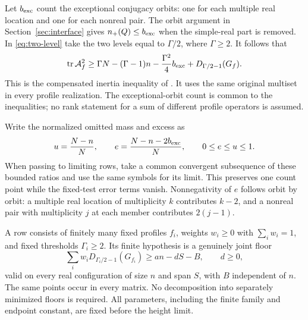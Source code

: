 \documentclass[11pt,reqno]{amsart}
\numberwithin{equation}{section}
\newcommand{\tr}{\operatorname{tr}}
\begin{document}
Let $b_{\rm exc}$ count the exceptional conjugacy orbits:
one for each multiple real location and one for each nonreal pair.
The orbit argument in Section~\ref{sec:interface} gives
$n_+(Q)\le b_{\rm exc}$ when the simple-real part is removed.
In \eqref{eq:two-level} take the two levels equal to $\Gamma/2$,
where $\Gamma\ge2$. It follows that
\begin{equation}
 \tr\mathcal A_f^2
 \ge\Gamma N-(\Gamma-1)n-\frac{\Gamma^2}{4}b_{\rm exc}
       +D_{\Gamma/2-1}(G_f).
 \label{eq:structural-inertia}
\end{equation}
This is the compensated inertia inequality of \cite{ChandruP6}.
It uses the same original multiset in every profile realization.
The exceptional-orbit count is common to the inequalities;
no rank statement for a sum of different profile operators is assumed.

Write the normalized omitted mass and excess as
\begin{equation}
 u=\frac{N-n}{N},\qquad
 e=\frac{N-n-2b_{\rm exc}}N,\qquad 0\le e\le u\le1.
 \label{eq:normalized-excess}
\end{equation}
When passing to limiting rows, take a common convergent subsequence
of these bounded ratios and use the same symbols for its limit.
This preserves one count point while the fixed-test error terms
vanish.
Nonnegativity of $e$ follows orbit by orbit: a multiple real location
of multiplicity $k$ contributes $k-2$, and a nonreal pair with
multiplicity $j$ at each member contributes $2(j-1)$.

A row consists of finitely many fixed profiles $f_i$,
weights $w_i\ge0$ with $\sum_iw_i=1$, and fixed thresholds
$\Gamma_i\ge2$. Its finite hypothesis is a genuinely joint floor
\begin{equation}
 \sum_iw_iD_{\Gamma_i/2-1}(G_{f_i})
 \ge an-dS-B,\qquad d\ge0,
 \label{eq:joint-affine-floor}
\end{equation}
valid on every real configuration of size $n$ and span $S$, with
$B$ independent of $n$. The same points occur in every matrix.
No decomposition into separately minimized floors is required.
All parameters, including the finite family and endpoint constant,
are fixed before the height limit.
\end{document}
